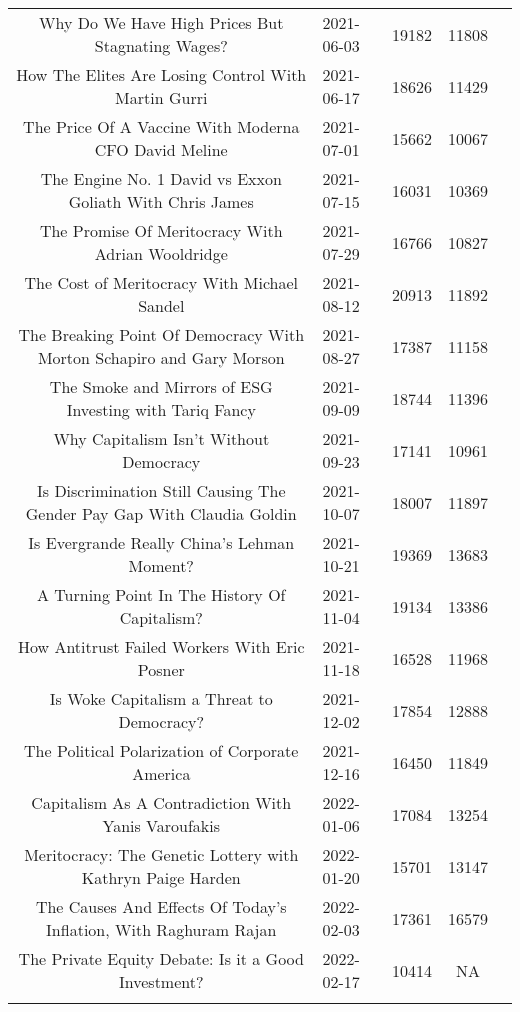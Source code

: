 \begin{table}[!htbp]
\begin{tabular}{@{\extracolsep{5pt}} clccc}
  Why Do We Have High Prices But Stagnating Wages? & 2021-06-03 & 19182 & 11808 \\ 
  How The Elites Are Losing Control With Martin Gurri & 2021-06-17 & 18626 & 11429 \\ 
  The Price Of A Vaccine With Moderna CFO David Meline & 2021-07-01 & 15662 & 10067 \\ 
  The Engine No. 1 David vs Exxon Goliath With Chris James & 2021-07-15 & 16031 & 10369 \\ 
  The Promise Of Meritocracy With Adrian Wooldridge & 2021-07-29 & 16766 & 10827 \\ 
  The Cost of Meritocracy With Michael Sandel & 2021-08-12 & 20913 & 11892 \\ 
  The Breaking Point Of Democracy With Morton Schapiro and Gary Morson & 2021-08-27 & 17387 & 11158 \\ 
  The Smoke and Mirrors of ESG Investing with Tariq Fancy & 2021-09-09 & 18744 & 11396 \\ 
  Why Capitalism Isn't Without Democracy & 2021-09-23 & 17141 & 10961 \\ 
  Is Discrimination Still Causing The Gender Pay Gap With Claudia Goldin & 2021-10-07 & 18007 & 11897 \\ 
  Is Evergrande Really China’s Lehman Moment? & 2021-10-21 & 19369 & 13683 \\ 
  A Turning Point In The History Of Capitalism? & 2021-11-04 & 19134 & 13386 \\ 
  How Antitrust Failed Workers With Eric Posner & 2021-11-18 & 16528 & 11968 \\ 
  Is Woke Capitalism a Threat to Democracy? & 2021-12-02 & 17854 & 12888 \\ 
  The Political Polarization of Corporate America & 2021-12-16 & 16450 & 11849 \\ 
  Capitalism As A Contradiction With Yanis Varoufakis & 2022-01-06 & 17084 & 13254 \\ 
  Meritocracy: The Genetic Lottery with Kathryn Paige Harden & 2022-01-20 & 15701 & 13147 \\ 
  The Causes And Effects Of Today's Inflation, With Raghuram Rajan & 2022-02-03 & 17361 & 16579 \\ 
  The Private Equity Debate: Is it a Good Investment? & 2022-02-17 & 10414 & NA \\ 
  \hline \\[-1.8ex] 
  \end{tabular} 
  \end{table} 